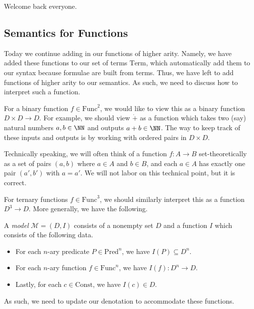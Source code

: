 
Welcome back everyone.

\subsection{Semantics for Functions}
Today we continue adding in our functions of higher arity. Namely, we have added these functions to our set of terms $\mathrm{Term}$, which automatically add them to our syntax because formulae are built from terms. Thus, we have left to add functions of higher arity to our semantics. As such, we need to discuss how to interpret such a function.
\begin{example}
	For a binary function $f\in\mathrm{Func}^2$, we would like to view this as a binary function $D\times D\to D$. For example, we should view $\dot+$ as a function which takes two (say) natural numbers $a,b\in\NN$ and outputs $a+b\in\NN$. The way to keep track of these inputs and outputs is by working with ordered pairs in $D\times D$.
\end{example}
\begin{remark}
	Technically speaking, we will often think of a function $f:A\to B$ set-theoretically as a set of pairs $(a,b)$ where $a\in A$ and $b\in B$, and each $a\in A$ has exactly one pair $(a',b')$ with $a=a'$. We will not labor on this technical point, but it is correct.
\end{remark}
For ternary functions $f\in\mathrm{Func}^3$, we should similarly interpret this as a function $D^3\to D$. More generally, we have the following.
\begin{defihelper}[Model]
	A \textit{model} $\mathcal M=(D,I)$ consists of a nonempty set $D$ and a function $I$ which consists of the following data.
	\begin{itemize}
		\item For each $n$-ary predicate $P\in\mathrm{Pred}^n$, we have $I(P)\subseteq D^n$.
		\item For each $n$-ary function $f\in\mathrm{Func}^n$, we have $I(f):D^n\to D$.
		\item Lastly, for each $c\in\mathrm{Const}$, we have $I(c)\in D$.
	\end{itemize}
\end{defihelper}
As such, we need to update our denotation to accommodate these functions.
